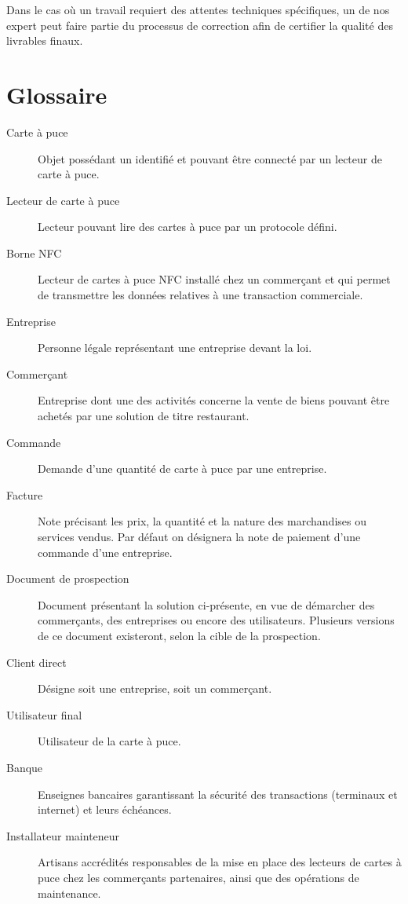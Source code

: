 Dans le cas où un travail requiert des attentes techniques spécifiques, un de
nos expert peut faire partie du processus de correction afin de certifier la
qualité des livrables finaux. \\

\section{Glossaire}

\begin{description}
  \item[Carte à puce] Objet possédant un identifié et pouvant être connecté par
    un lecteur de carte à puce.
  \item[Lecteur de carte à puce] Lecteur pouvant lire des cartes à puce par un
    protocole défini.
  \item[Borne NFC] Lecteur de cartes à puce NFC installé chez un commerçant et qui
    permet de transmettre les données relatives à une transaction commerciale.
  \item[Entreprise] Personne légale représentant une entreprise devant la loi.
  \item[Commerçant] Entreprise dont une des activités concerne la vente de
    biens pouvant être achetés par une solution de titre restaurant.
  \item[Commande] Demande d'une quantité de carte à puce par une entreprise.
  \item[Facture] Note précisant les prix, la quantité et la nature des
    marchandises ou services vendus. Par défaut on désignera la note de
    paiement d'une commande d'une entreprise.
  \item[Document de prospection] Document présentant la solution ci-présente,
    en vue de démarcher des commerçants, des entreprises ou encore des
    utilisateurs. Plusieurs versions de ce document existeront, selon la cible
    de la prospection.
  \item[Client direct] Désigne soit une entreprise, soit un commerçant.
  \item[Utilisateur final] Utilisateur de la carte à puce.
  \item[Banque] Enseignes bancaires garantissant la sécurité des transactions
    (terminaux et internet) et leurs échéances.
  \item[Installateur mainteneur] Artisans accrédités responsables de la mise en
    place des lecteurs de cartes à puce chez les commerçants partenaires, ainsi
    que des opérations de maintenance.

\end{description}
